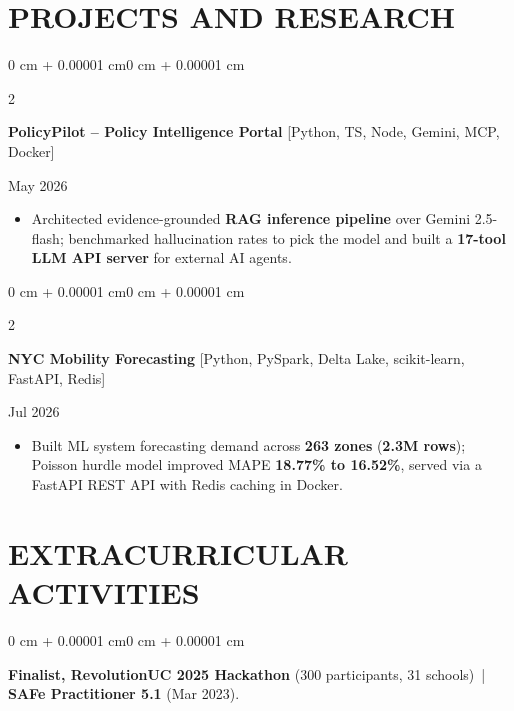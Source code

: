 \documentclass[10pt, letterpaper]{article}
\newenvironment{highlights}{
    \begin{itemize}[
        topsep=0.10 cm,
        parsep=0.06 cm,
        partopsep=0pt,
        itemsep=0.06 cm,
        leftmargin=12pt
    ]
}{
    \end{itemize}
}
\newenvironment{onecolentry}{
    \begin{adjustwidth}{0 cm + 0.00001 cm}{0 cm + 0.00001 cm}
}{
    \end{adjustwidth}
}
\newenvironment{twocolentry}[2][]{
    \onecolentry
    \def\secondColumn{#2}
    \setcolumnwidth{\fill, 4.5 cm}
    \begin{paracol}{2}
}{
    \switchcolumn \raggedleft \secondColumn
    \end{paracol}
    \endonecolentry
}
\begin{document}
\section{PROJECTS AND RESEARCH}
\begin{twocolentry}{May 2026}
\textbf{PolicyPilot -- Policy Intelligence Portal} [Python, TS, Node, Gemini, MCP, Docker]
\end{twocolentry}
\begin{highlights}
  \item Architected evidence-grounded \textbf{RAG inference pipeline} over Gemini 2.5-flash; benchmarked hallucination rates to pick the model and built a \textbf{17-tool LLM API server} for external AI agents.
\end{highlights}

\vspace{0.06 cm}

\begin{twocolentry}{Jul 2026}
\textbf{NYC Mobility Forecasting} [Python, PySpark, Delta Lake, scikit-learn, FastAPI, Redis]
\end{twocolentry}
\begin{highlights}
  \item Built ML system forecasting demand across \textbf{263 zones} (\textbf{2.3M rows}); Poisson hurdle model improved MAPE \textbf{18.77\% to 16.52\%}, served via a FastAPI REST API with Redis caching in Docker.
\end{highlights}

\section{EXTRACURRICULAR ACTIVITIES}
\begin{onecolentry}
\textbf{Finalist, RevolutionUC 2025 Hackathon} (300 participants, 31 schools) \,|\, \textbf{SAFe Practitioner 5.1} (Mar 2023).
\end{onecolentry}
\end{document}
